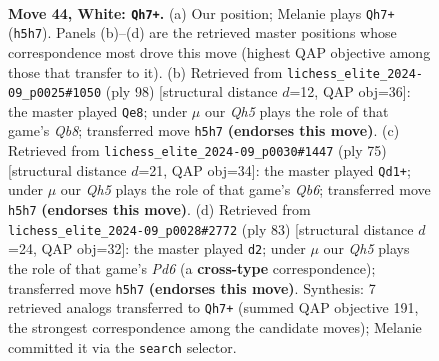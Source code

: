 \documentclass[11pt]{article}
\begin{document}
\clearpage

\begin{figure}[p]\centering
\begin{subfigure}{0.46\textwidth}\centering
\resizebox{\linewidth}{!}{%
\newchessgame
\chessboard[
  setfen={r7/4k3/5p2/3p3Q/3q1P2/p5P1/P5KP/8 w - - 7 44},
  showmover=false,
  pgfstyle=straightmove, color=movearrow, markmove={h5-h7}
]}
\caption{}
\end{subfigure}\hfill
\begin{subfigure}{0.46\textwidth}\centering
\resizebox{\linewidth}{!}{%
\newchessgame
\chessboard[
  setfen={1Q6/6pk/8/5p2/4p3/1pq1P1P1/5PK1/8 w - - 4 50},
  showmover=false,
  pgfstyle=straightmove, color=movearrow, markmove={b8-e8}
]}
\caption{}
\end{subfigure}
\\[4pt]
\begin{subfigure}{0.46\textwidth}\centering
\resizebox{\linewidth}{!}{%
\newchessgame
\chessboard[
  setfen={7k/6p1/1p2P2p/2p2Q2/8/1q4P1/5PP1/6K1 b - - 0 38},
  showmover=false,
  pgfstyle=straightmove, color=movearrow, markmove={b3-d1}
]}
\caption{}
\end{subfigure}\hfill
\begin{subfigure}{0.46\textwidth}\centering
\resizebox{\linewidth}{!}{%
\newchessgame
\chessboard[
  setfen={5Q2/7p/5pk1/p7/4p3/PP1pq1P1/7P/7K b - - 1 42},
  showmover=false,
  pgfstyle=straightmove, color=movearrow, markmove={d3-d2}
]}
\caption{}
\end{subfigure}
\caption{\textbf{Move 44, White: \texttt{Qh7+}.} (a) Our position; Melanie plays \texttt{Qh7+} (\texttt{h5h7}). Panels (b)--(d) are the retrieved master positions whose correspondence most drove this move (highest QAP objective among those that transfer to it). (b) Retrieved from \texttt{lichess\_elite\_2024-09\_p0025\#1050} (ply 98) [structural distance $d$=12, QAP obj=36]: the master played \texttt{Qe8}; under $\mu$ our \emph{Qh5} plays the role of that game's \emph{Qb8}; transferred move \texttt{h5h7} \textbf{(endorses this move)}. (c) Retrieved from \texttt{lichess\_elite\_2024-09\_p0030\#1447} (ply 75) [structural distance $d$=21, QAP obj=34]: the master played \texttt{Qd1+}; under $\mu$ our \emph{Qh5} plays the role of that game's \emph{Qb6}; transferred move \texttt{h5h7} \textbf{(endorses this move)}. (d) Retrieved from \texttt{lichess\_elite\_2024-09\_p0028\#2772} (ply 83) [structural distance $d$=24, QAP obj=32]: the master played \texttt{d2}; under $\mu$ our \emph{Qh5} plays the role of that game's \emph{Pd6} (a \textbf{cross-type} correspondence); transferred move \texttt{h5h7} \textbf{(endorses this move)}. Synthesis: 7 retrieved analogs transferred to \texttt{Qh7+} (summed QAP objective 191, the strongest correspondence among the candidate moves); Melanie committed it via the \texttt{search} selector.}
\label{fig:thought-m86}
\end{figure}
\end{document}
